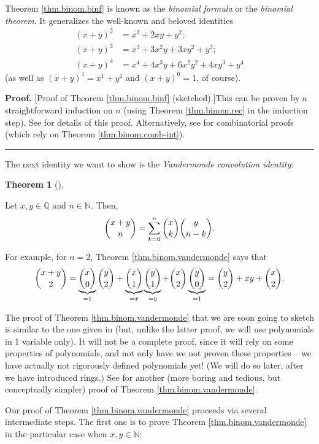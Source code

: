 \documentclass[numbers=enddot,12pt,final,onecolumn,notitlepage]{scrartcl}%
\numberwithin{exer}{subsection}
\theoremstyle{definition}
\newtheorem{theo}{Theorem}[subsection]
\newenvironment{theorem}[1][]
{\begin{theo}[#1]\begin{leftbar}}
{\end{leftbar}\end{theo}}
\newenvironment{proof}[1][Proof]{\noindent\textbf{#1.} }{\ \rule{0.5em}{0.5em}}
\let\sumnonlimits\sum
\renewcommand{\sum}{\sumnonlimits\limits}
\begin{document}
Theorem \ref{thm.binom.binf} is known as the \textit{binomial formula} or the
\textit{binomial theorem}. It generalizes the well-known and beloved
identities%
\begin{align*}
\left(  x+y\right)  ^{2}  &  =x^{2}+2xy+y^{2};\\
\left(  x+y\right)  ^{3}  &  =x^{3}+3x^{2}y+3xy^{2}+y^{3};\\
\left(  x+y\right)  ^{4}  &  =x^{4}+4x^{3}y+6x^{2}y^{2}+4xy^{3}+y^{4}%
\end{align*}
(as well as $\left(  x+y\right)  ^{1}=x^{1}+y^{1}$ and $\left(  x+y\right)
^{0}=1$, of course).

\begin{proof}
[Proof of Theorem \ref{thm.binom.binf} (sketched).]This can be proven by a
straightforward induction on $n$ (using Theorem \ref{thm.binom.rec} in the
induction step). See \cite[Exercise 3.6]{detnotes} for details of this proof.
Alternatively, see \cite[Identity 11.4]{Galvin} for combinatorial proofs
(which rely on Theorem \ref{thm.binom.comb-int}).
\end{proof}

The next identity we want to show is the \textit{Vandermonde convolution
identity}:

\begin{theorem}
\label{thm.binom.vandermonde}Let $x,y\in\mathbb{Q}$ and $n\in\mathbb{N}$.
Then,%
\[
\dbinom{x+y}{n}=\sum_{k=0}^{n}\dbinom{x}{k}\dbinom{y}{n-k}.
\]

\end{theorem}

For example, for $n=2$, Theorem \ref{thm.binom.vandermonde} says that
\[
\dbinom{x+y}{2}=\underbrace{\dbinom{x}{0}}_{=1}\dbinom{y}{2}%
+\underbrace{\dbinom{x}{1}}_{=x}\underbrace{\dbinom{y}{1}}_{=y}+\dbinom{x}%
{2}\underbrace{\dbinom{y}{0}}_{=1}=\dbinom{y}{2}+xy+\dbinom{x}{2}.
\]


The proof of Theorem \ref{thm.binom.vandermonde} that we are soon going to
sketch is similar to the one given in \cite[\S 3.3.3]{detnotes} (but, unlike
the latter proof, we will use polynomials in $1$ variable only). It will not
be a complete proof, since it will rely on some properties of polynomials, and
not only have we not proven these properties -- we have actually not
rigorously defined polynomials yet! (We will do so later, after we have
introduced rings.) See \cite[\S 3.3.2]{detnotes} for another (more boring and
tedious, but conceptually simpler) proof of Theorem
\ref{thm.binom.vandermonde}.

Our proof of Theorem \ref{thm.binom.vandermonde} proceeds via several
intermediate steps. The first one is to prove Theorem
\ref{thm.binom.vandermonde} in the particular case when $x,y\in\mathbb{N}$:
\end{document}
